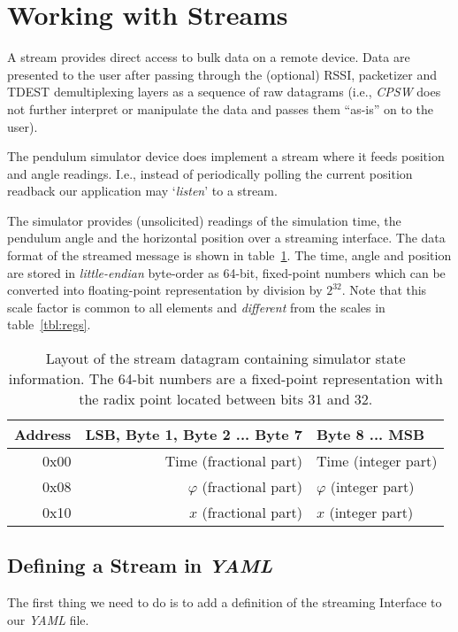 \documentclass[10pt]{article}
\newcommand{\ita}[1]{\emph{#1}}
\newcommand{\cpsw}      {\ita {CPSW}}
\newcommand{\yaml}      {\ita {YAML}}
\newcounter{tbls}
\begin{document}
\section{Working with Streams}
A stream provides direct access to bulk data on a remote device. Data are
presented to the user after passing through the (optional) RSSI, packetizer
and TDEST demultiplexing layers as a sequence of raw datagrams (i.e., \cpsw{}
does not further interpret or manipulate the data and passes them ``as-is''
on to the user).

The pendulum simulator device does implement a stream where it feeds position
and angle readings. I.e., instead of periodically polling the current position
readback our application may `{\em listen}' to a stream.

The simulator provides (unsolicited) readings of the simulation time, the pendulum
angle and the horizontal position over a streaming interface. The data format
of the streamed message is shown in table~\ref{tbl:strmmsg}. The time, angle and
position are stored in {\em little-endian} byte-order as 64-bit, fixed-point numbers
which can be converted into floating-point representation by division by $2^{32}$.
Note that this scale factor is common to all elements and {\em different} from the
scales in table~\ref{tbl:regs}.

\begin{table}[ht]
\label{tbl:strmmsg}
\hspace*{\fill}
\begin{tabular}{rrl}
Address & LSB, Byte 1, Byte 2 ... Byte 7      & Byte 8 \hfill ... \hfill MSB \\
\hline
0x00    & Time      \hfill (fractional part)  & Time \hfill (integer part) \\
0x08    & $\varphi$ \hfill (fractional part)  & $\varphi$ \hfill (integer part) \\
0x10    & $x$       \hfill (fractional part)  & $x$       \hfill (integer part) \\
\end{tabular}
\hspace*{\fill}
\caption{Layout of the stream datagram containing simulator state information. The
64-bit numbers are a fixed-point representation with the radix point located between
bits 31 and 32.}
\end{table}

\subsection{Defining a Stream in \yaml}
The first thing we need to do is to add a definition of the streaming Interface to
our \yaml{} file.
\end{document}
